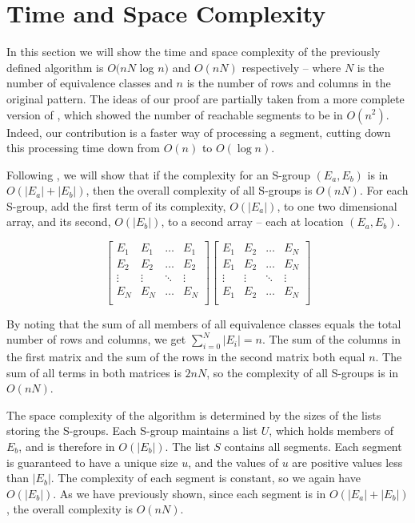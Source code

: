 \section{Time and Space Complexity}
\label{s_run}


In this section we will show the time and space complexity of the previously defined algorithm is $O(nN$ log $n)$ and $O(nN)$ respectively -- where $N$ is the number of equivalence classes and $n$ is the number of rows and columns in the original pattern.
The ideas of our proof are partially taken from
a more complete version of \cite{ACJKLW07},
 which showed the number of reachable segments to be in $O(n^2)$.
Indeed, our contribution is a faster way of processing a segment,
cutting down this processing time down from $O(n)$ to $O(\log n)$.

Following \cite{ACJKLW07},
we will show that if the complexity for an S-group $(E_a,E_b)$ is in $O(|E_a| + |E_b|)$, then the overall complexity of all S-groups is $O(nN)$.
For each S-group, add the first term of its complexity, $O(|E_a|)$, to one two dimensional array, and its second, $O(|E_b|)$, to a second array -- each at location $(E_a,E_b)$.

\[
\begin{bmatrix}
    E_1 &  E_1 & \dots & E_1\\
    E_2 &  E_2 & \dots & E_2\\
    \vdots & \vdots & \ddots & \vdots \\
    E_N &  E_N & \dots & E_N\\
\end{bmatrix}
\begin{bmatrix}
    E_1 &  E_2 & \dots & E_N\\
    E_1 &  E_2 & \dots & E_N\\
    \vdots & \vdots & \ddots & \vdots \\
    E_1 &  E_2 & \dots & E_N\\
\end{bmatrix}
\]

By noting that the sum of all members of all equivalence classes equals the total number of rows and columns, we get $\sum_{i=0}^N{|E_i|} = n$.
The sum of the columns in the first matrix and the sum of the rows in the second matrix both equal $n$.
The sum of all terms in both matrices is $2nN$, so the complexity of all S-groups is in $O(nN)$.

The space complexity of the algorithm is determined by the sizes of the lists storing the S-groups.
Each S-group maintains a list $U$, which holds members of $E_b$,
 and is therefore in $O(|E_b|)$. The list $S$ contains all segments.
Each segment is guaranteed to have a unique size $u$,
and the values of $u$ are positive values less than $|E_b|$.
The complexity of each segment is constant, so we again have $O(|E_b|)$.
As we have previously shown, since each segment is in
$O(|E_a| + |E_b|)$, the overall complexity is $O(nN)$.

